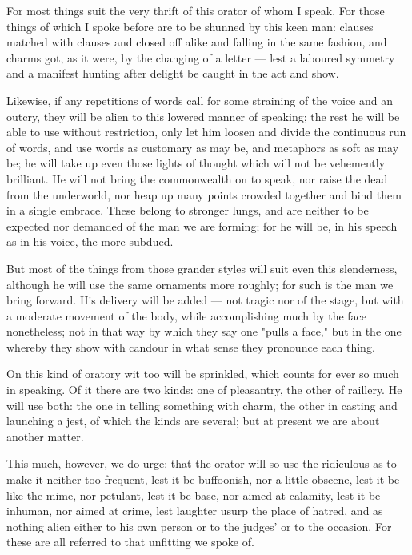  For most things suit the very thrift of this orator of whom I speak. For those things of which I spoke before are to be shunned by this keen man: clauses matched with clauses and closed off alike and falling in the same fashion, and charms got, as it were, by the changing of a letter — lest a laboured symmetry and a manifest hunting after delight be caught in the act and show.

 Likewise, if any repetitions of words call for some straining of the voice and an outcry, they will be alien to this lowered manner of speaking; the rest he will be able to use without restriction, only let him loosen and divide the continuous run of words, and use words as customary as may be, and metaphors as soft as may be; he will take up even those lights of thought which will not be vehemently brilliant. He will not bring the commonwealth on to speak, nor raise the dead from the underworld, nor heap up many points crowded together and bind them in a single embrace. These belong to stronger lungs, and are neither to be expected nor demanded of the man we are forming; for he will be, in his speech as in his voice, the more subdued.

 But most of the things from those grander styles will suit even this slenderness, although he will use the same ornaments more roughly; for such is the man we bring forward. His delivery will be added — not tragic nor of the stage, but with a moderate movement of the body, while accomplishing much by the face nonetheless; not in that way by which they say one "pulls a face," but in the one whereby they show with candour in what sense they pronounce each thing.

 On this kind of oratory wit too will be sprinkled, which counts for ever so much in speaking. Of it there are two kinds: one of pleasantry, the other of raillery. He will use both: the one in telling something with charm, the other in casting and launching a jest, of which the kinds are several; but at present we are about another matter.

 This much, however, we do urge: that the orator will so use the ridiculous as to make it neither too frequent, lest it be buffoonish, nor a little obscene, lest it be like the mime, nor petulant, lest it be base, nor aimed at calamity, lest it be inhuman, nor aimed at crime, lest laughter usurp the place of hatred, and as nothing alien either to his own person or to the judges' or to the occasion. For these are all referred to that unfitting we spoke of.


